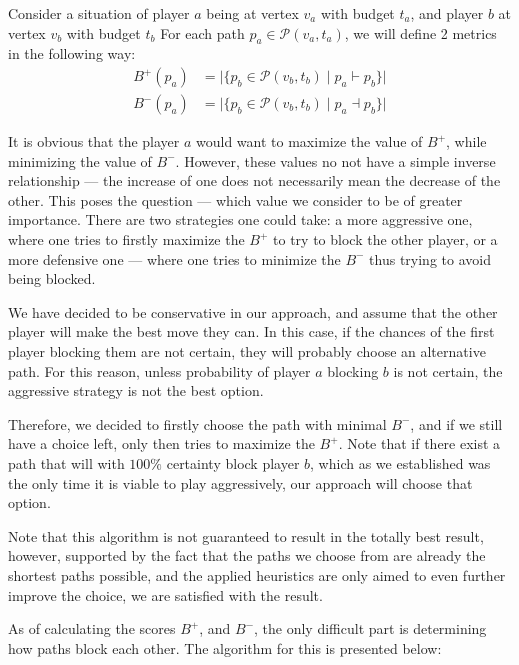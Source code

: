 \documentclass[12pt]{article}
\newcommand*{\p}{\ensuremath{\mathcal{P}}}
\newcommand*{\blocks}{\vdash}
\newcommand*{\blockedBy}{\dashv}
\newcommand*{\blockingScore}{B^+}
\newcommand*{\blockedScore}{B^-}
\begin{document}
Consider a situation of player $a$ being at vertex $v_a$ with budget $t_a$,
and player $b$ at vertex $v_b$ with budget $t_b$
For each path $p_a \in \p(v_a, t_a)$, we will define 2 metrics in the following way:
\begin{align}
    \blockingScore(p_a) & = \big| \{ p_b \in \p(v_b,t_b) \mid p_a \blocks p_b \} \big| \label{eq:blocking_score}   \\[.5ex]
    \blockedScore(p_a)  & = \big| \{ p_b \in \p(v_b,t_b) \mid p_a \blockedBy p_b \} \big| \label{eq:blocked_score}
\end{align}

It is obvious that the player $a$ would want to maximize the value of $\blockingScore$,
while minimizing the value of $\blockedScore$.
However, these values no not have a simple inverse relationship --- the increase of one does not necessarily mean the decrease of the other.
This poses the question --- which value we consider to be of greater importance.
There are two strategies one could take: a more aggressive one, where one tries to firstly maximize the $\blockingScore$ to try to block the other player,
or a more defensive one --- where one tries to minimize the $\blockedScore$ thus trying to avoid being blocked.

We have decided to be conservative in our approach, and assume that the other player will make the best move they can.
In this case, if the chances of the first player blocking them are not certain, they will probably choose an alternative path.
For this reason, unless probability of player $a$ blocking $b$ is not certain, the aggressive strategy is not the best option.

Therefore, we decided to firstly choose the path with minimal $\blockedScore$,
and if we still have a choice left, only then tries to maximize the $\blockingScore$.
Note that if there exist a path that will with $100\%$ certainty block player $b$,
which as we established was the only time it is viable to play aggressively, our approach will choose that option.

Note that this algorithm is not guaranteed to result in the totally best result,
however, supported by the fact that the paths we choose from are already the shortest paths possible,
and the applied heuristics are only aimed to even further improve the choice, we are satisfied with the result.

As of calculating the scores $\blockingScore$, and $\blockedScore$, the only difficult part is determining how paths block each other.
The algorithm for this is presented below:
\end{document}
